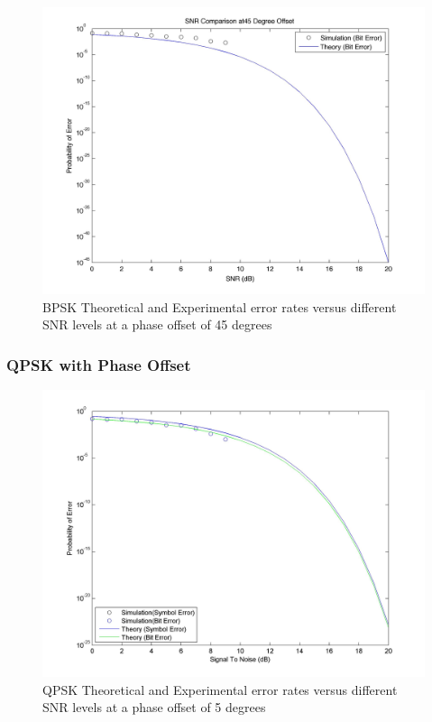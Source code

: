 \documentclass[]{article}
\begin{document}
\begin{figure}[H]
\centering
\hspace*{-2cm}\includegraphics[width=1.3\textwidth]{bpSNRpo4.jpg}
\caption{BPSK Theoretical and Experimental error rates versus different SNR levels at a phase offset of 45 degrees }
\end{figure}


\subsubsection{QPSK with Phase Offset}
\label{sec:qpsk_phase}
\begin{figure}[H]
\centering
\hspace*{-2cm}\includegraphics[width=1.3\textwidth]{qpSNRpo1.jpg}
\caption{QPSK Theoretical and Experimental error rates versus different SNR levels at a phase offset of 5 degrees }
\end{figure}
\end{document}
